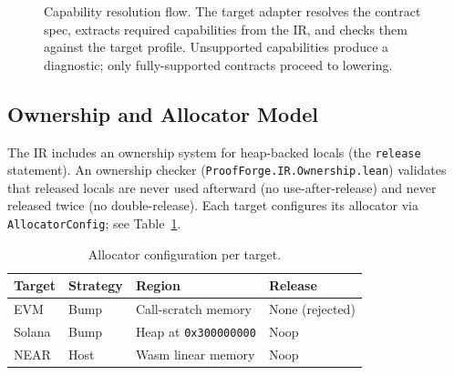 \documentclass[sigconf]{acmart}
\newcommand{\ttab}{\scriptsize}
\begin{document}
\begin{figure}[t]
  \centering
  \caption{Capability resolution flow. The target adapter resolves the contract spec,
  extracts required capabilities from the IR, and checks them against the target profile.
  Unsupported capabilities produce a diagnostic; only fully-supported contracts proceed to lowering.}
  \label{fig:cap-flow}
\end{figure}

\subsection{Ownership and Allocator Model}

The IR includes an ownership system for heap-backed locals (the \texttt{release} statement).
An ownership checker (\texttt{ProofForge.IR.Ownership.lean}) validates that released locals are
never used afterward (no use-after-release) and never released twice (no double-release). Each
target configures its allocator via \texttt{AllocatorConfig}; see Table~\ref{tab:alloc}.

\begin{table}[t]
  \caption{Allocator configuration per target.}
  \label{tab:alloc}
  \centering
  \ttab
  \begin{tabularx}{\columnwidth}{l l X l}
    \toprule
    \bfseries Target & \bfseries Strategy & \bfseries Region & \bfseries Release \\
    \midrule
    EVM & Bump & Call-scratch memory & None (rejected) \\
    Solana & Bump & Heap at \texttt{0x300000000} & Noop \\
    NEAR & Host & Wasm linear memory & Noop \\
    \bottomrule
  \end{tabularx}
\end{table}
\end{document}
